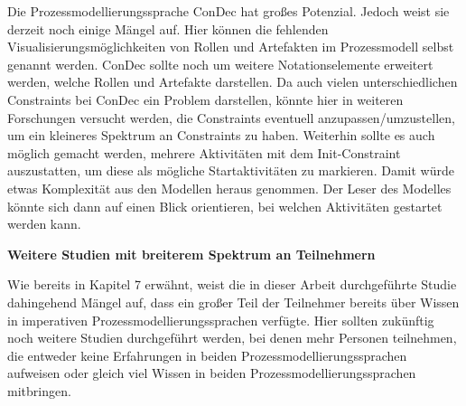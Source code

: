 Die Prozessmodellierungssprache ConDec hat großes Potenzial. Jedoch weist sie derzeit noch einige Mängel auf. Hier können die fehlenden Visualisierungsmöglichkeiten von Rollen und Artefakten im Prozessmodell selbst genannt werden. ConDec sollte noch um weitere Notationselemente erweitert werden, welche Rollen und Artefakte darstellen.\newline
Da auch vielen unterschiedlichen Constraints bei ConDec ein Problem darstellen, könnte hier in weiteren Forschungen versucht werden, die Constraints eventuell anzupassen/umzustellen, um ein kleineres Spektrum an Constraints zu haben.\newline
Weiterhin sollte es auch möglich gemacht werden, mehrere Aktivitäten mit dem Init-Constraint auszustatten, um diese als mögliche Startaktivitäten zu markieren. Damit würde etwas Komplexität aus den Modellen heraus genommen. Der Leser des Modelles könnte sich dann auf einen Blick orientieren, bei welchen Aktivitäten gestartet werden kann.\newline

\textbf{Weitere Studien mit breiterem Spektrum an Teilnehmern}

Wie bereits in Kapitel 7 erwähnt, weist die in dieser Arbeit durchgeführte Studie dahingehend Mängel auf, dass ein großer Teil der Teilnehmer bereits über Wissen in imperativen Prozessmodellierungssprachen verfügte. Hier sollten zukünftig noch weitere Studien durchgeführt werden, bei denen mehr Personen teilnehmen, die entweder keine Erfahrungen in beiden Prozessmodellierungssprachen aufweisen oder gleich viel Wissen in beiden Prozessmodellierungssprachen mitbringen.\newline





